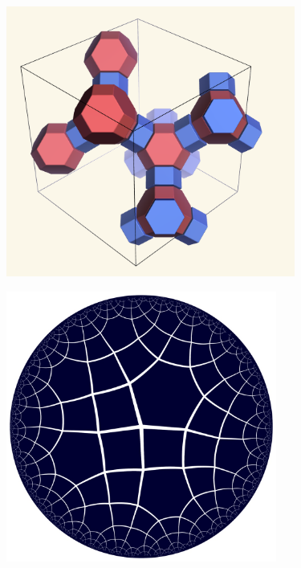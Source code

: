 \documentclass{beamer}
\begin{document}
\begin{frame}
  \begin{center}
    \includegraphics[height=3.5in]{fau-cages-new}
  \end{center}
\end{frame}

\begin{frame}
  \begin{center}
    \includegraphics[height=3.5in]{hqc0576}
  \end{center}
\end{frame}
\end{document}
